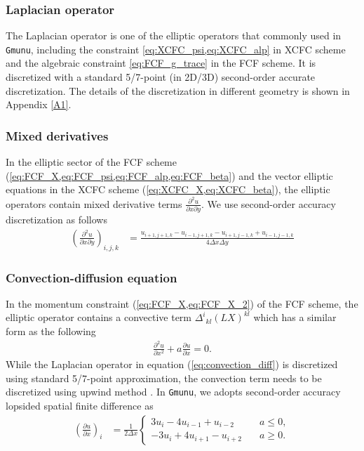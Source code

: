\subsubsection{Laplacian operator}
The Laplacian operator is one of the elliptic operators that commonly used in \texttt{Gmunu},
including the constraint \cref{eq:XCFC_psi,eq:XCFC_alp} in XCFC scheme 
and the algebraic constraint \cref{eq:FCF_g_trace} in the FCF scheme.
It is discretized with a standard 5/7-point (in 2D/3D) second-order accurate discretization.
The details of the discretization in different geometry is shown in Appendix \ref{A1}.

\subsubsection{Mixed derivatives}
In the elliptic sector of the FCF scheme (\cref{eq:FCF_X,eq:FCF_psi,eq:FCF_alp,eq:FCF_beta})
and the vector elliptic equations in the XCFC scheme (\cref{eq:XCFC_X,eq:XCFC_beta}),
the elliptic operators contain mixed derivative terms $\frac{\partial^2 u}{\partial x \partial y}$.
We use second-order accuracy discretization as follows
\begin{align}
    \left(\frac{\partial^2 u}{\partial x \partial y} \right)_{i,j,k} &=
    \frac{u_{i+1,j+1,k} - u_{i-1,j+1,k} - u_{i+1,j-1,k} + u_{i-1,j-1,k}}{4 \Delta x \Delta y}
\end{align}

\subsubsection{Convection-diffusion equation}
In the momentum constraint (\cref{eq:FCF_X,eq:FCF_X_2}) of the FCF scheme,
the elliptic operator contains a convective term $\Delta^i{}_{kl}\left( L X \right)^{kl}$
which has a similar form as the following
\begin{align}\label{eq:convection_diff}
    \frac{\partial^2 u}{\partial x^2} + a \frac{\partial u}{\partial x} = 0.
\end{align}
While the Laplacian operator in equation (\ref{eq:convection_diff}) is discretized using standard 5/7-point approximation,
the convection term needs to be discretized using upwind method \cite{trottenberg2000multigrid}.
In \texttt{Gmunu}, we adopts second-order accuracy lopsided spatial finite difference as
\begin{align}
    \left(\frac{\partial u}{\partial x} \right)_i &= \frac{1}{2 \Delta x}
    \begin{cases}
        3 u_i - 4 u_{i-1} + u_{i-2} &\quad a \leq 0,\\
        -3 u_i + 4 u_{i+1} - u_{i+2} &\quad a \geq 0.
    \end{cases}
\end{align}

